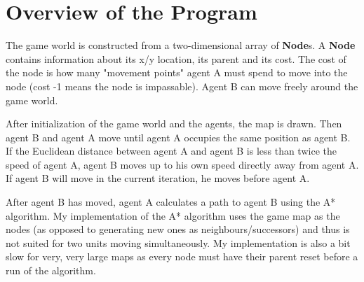 \section{Overview of the Program}
The game world is constructed from a two-dimensional array of \textbf{Node}s. A \textbf{Node} contains information about its x/y location, its parent and its cost. The cost of the node is how many "movement points" agent A must spend to move into the node (cost -1 means the node is impassable). Agent B can move freely around the game world.

After initialization of the game world and the agents, the map is drawn. Then agent B and agent A move until agent A occupies the same position as agent B. If the Euclidean distance between agent A and agent B is less than twice the speed of agent A, agent B moves up to his own speed directly away from agent A. If agent B will move in the current iteration, he moves before agent A.

After agent B has moved, agent A calculates a path to agent B using the A* algorithm. My implementation of the A* algorithm uses the game map as the nodes (as opposed to generating new ones as neighbours/successors) and thus is not suited for two units moving simultaneously.  My implementation is also a bit slow for very, very large maps as every node must have their parent reset before a run of the algorithm.